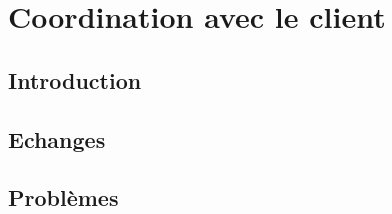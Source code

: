 
\chapter[Le client]{Coordination avec le client}
    \section{Introduction}
    \section{Echanges}
    \section{Problèmes}

    